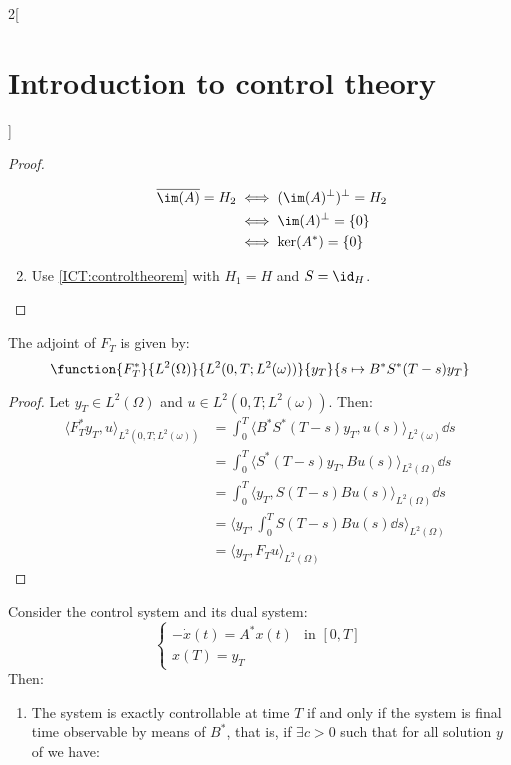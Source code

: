 \documentclass[../../../main_math.tex]{subfiles}
\begin{document}
\begin{multicols}{2}[\section{Introduction to control theory}]
\begin{proof}
\begin{enumerate}
            \begin{align*}
              \overline{\im(A)}=H_2 & \iff (\im(A)^{\perp})^\perp=H_2 \\
                                    & \iff\im(A)^{\perp}=\{0\}        \\
                                    & \iff \ker(A^*)=\{0\}
            \end{align*}
      \item Use \cref{ICT:controltheorem} with $H_1=H$ and $S=\id_H$.
    \end{enumerate}
  \end{proof}
  \begin{proposition}
    The adjoint of $F_T$ is given by:
    $$
      \function{F_T^*}{L^2(\Omega)}{L^2(0,T;L^2(\omega))}{y_T}{s\mapsto B^*S^*(T-s)y_T}
    $$
  \end{proposition}
  \begin{proof}
    Let $y_T\in L^2(\Omega)$ and $u\in L^2(0,T;L^2(\omega))$. Then:
    \begin{align*}
      \langle F_T^*y_T,u\rangle_{L^2(0,T;L^2(\omega))} & = \int_0^T\langle B^*S^*(T-s)y_T,u(s)\rangle_{L^2(\omega)} \dd s \\
                                                       & = \int_0^T\langle S^*(T-s)y_T,Bu(s)\rangle_{L^2(\Omega)} \dd s   \\
                                                       & = \int_0^T\langle y_T,S(T-s)Bu(s)\rangle_{L^2(\Omega)} \dd s     \\
                                                       & = \langle y_T, \int_0^T S(T-s)Bu(s)\dd s\rangle_{L^2(\Omega)}    \\
                                                       & = \langle y_T, F_Tu\rangle_{L^2(\Omega)}
    \end{align*}
  \end{proof}
  \begin{theorem}
    Consider the control system  and its dual system:
    \begin{equation}\label{ICT:dual_control_system}
      \begin{cases}
        -\dot{x}(t)=A^*x(t) & \text{in } [0,T] \\
        x(T)=y_T
      \end{cases}
    \end{equation}
    Then:
    \begin{enumerate}
      \item The system  is exactly controllable at time $T$ if and only if the system  is final time observable by means of $B^*$, that is, if $\exists c>0$ such that for all solution $y$ of  we have:

\end{enumerate}
\end{theorem}
\end{multicols}
\end{document}
